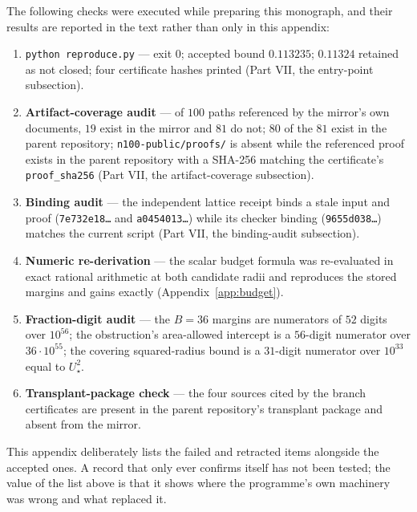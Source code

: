 The following checks were executed while preparing this monograph, and their results are reported in
the text rather than only in this appendix:

\begin{enumerate}[leftmargin=1.6em,itemsep=3pt]
\item \texttt{python reproduce.py} --- exit $0$; accepted bound $0.113235$; $0.11324$ retained as
not closed; four certificate hashes printed (Part VII, the entry-point subsection).
\item \textbf{Artifact-coverage audit} --- of $100$ paths referenced by the mirror's own documents,
$19$ exist in the mirror and $81$ do not; $80$ of the $81$ exist in the parent repository;
\texttt{n100-\allowbreak{}public/\allowbreak{}proofs/\allowbreak{}} is absent while the referenced proof exists in the parent repository
with a SHA-256 matching the certificate's \texttt{proof\_\allowbreak{}sha256} (Part VII, the artifact-coverage subsection).
\item \textbf{Binding audit} --- the independent lattice receipt binds a stale input and proof
(\texttt{7e732e18\ldots} and \texttt{a0454013\ldots}) while its checker binding
(\texttt{9655d038\ldots}) matches the current script (Part VII, the binding-audit subsection).
\item \textbf{Numeric re-derivation} --- the scalar budget formula was re-evaluated in exact rational
arithmetic at both candidate radii and reproduces the stored margins and gains exactly
(Appendix~\ref{app:budget}).
\item \textbf{Fraction-digit audit} --- the $B=36$ margins are numerators of $52$ digits over
$10^{56}$; the obstruction's area-allowed intercept is a $56$-digit numerator over $36\cdot10^{55}$;
the covering squared-radius bound is a $31$-digit numerator over $10^{33}$ equal to $U_\star^2$.
\item \textbf{Transplant-package check} --- the four sources cited by the branch certificates are
present in the parent repository's transplant package and absent from the mirror.
\end{enumerate}

\begin{remark}
This appendix deliberately lists the failed and retracted items alongside the accepted ones. A
record that only ever confirms itself has not been tested; the value of the list above is that it
shows where the programme's own machinery was wrong and what replaced it.
\end{remark}
